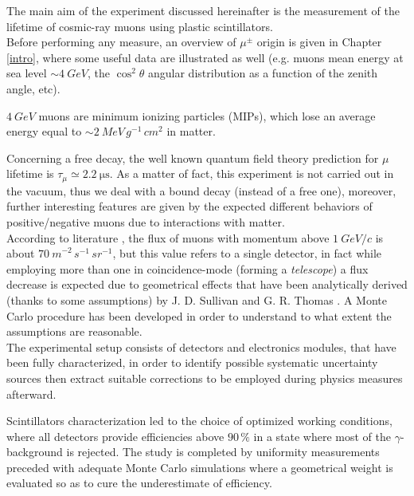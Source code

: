 The main aim of the experiment discussed hereinafter is the measurement of the lifetime of cosmic-ray muons using plastic scintillators.\\

Before performing any measure, an overview of $\mu^\pm$ origin is given in Chapter \ref{intro}, where some useful data \cite{PDG} are illustrated as well (e.g. muons mean energy at sea level $\sim\SI{4}{GeV}$, the $\cos^2\theta$ angular distribution as a function of the zenith angle, etc).

$\SI{4}{GeV}$ muons are minimum ionizing particles (MIPs), which lose an average energy equal to $\sim \SI{2}{MeV}\,\si{g}^{-1}\,\si{cm}^{2}$ in matter.

Concerning a free decay, the well known quantum field theory prediction for $\mu$ lifetime is $\tau_{\mu}\simeq \SI{2.2}{\micro\second}$. As a matter of fact, this experiment is not carried out in the vacuum, thus we deal with a bound decay (instead of a free one), moreover, further interesting features are given by the expected different behaviors of positive/negative muons due to interactions with matter.\\

According to literature \cite{PDG}, the flux of muons with momentum above $\SI{1}{GeV/c}$ is about $\SI{70}{m}^{-2}\,\si{s}^{-1}\,\si{sr}^{-1}$, but this value refers to a single detector, in fact while employing more than one in coincidence-mode (forming a \emph{telescope}) a flux decrease is expected due to geometrical effects that have been analytically derived (thanks to some assumptions) by J. D. Sullivan \cite{Sullivan} and G. R. Thomas \cite{Thomas}. A Monte Carlo procedure has been developed in order to understand to what extent the assumptions are reasonable.\\

The experimental setup consists of detectors and electronics modules, that have been fully characterized, in order to identify possible systematic uncertainty sources then extract suitable corrections to be employed during physics measures afterward.

Scintillators characterization led to the choice of optimized working conditions, where all detectors provide efficiencies above $90\,\%$ in a state where most of the $\gamma$-background is rejected. The study is completed by uniformity measurements preceded with adequate Monte Carlo simulations where a geometrical weight is evaluated so as to cure the underestimate of efficiency.\\

